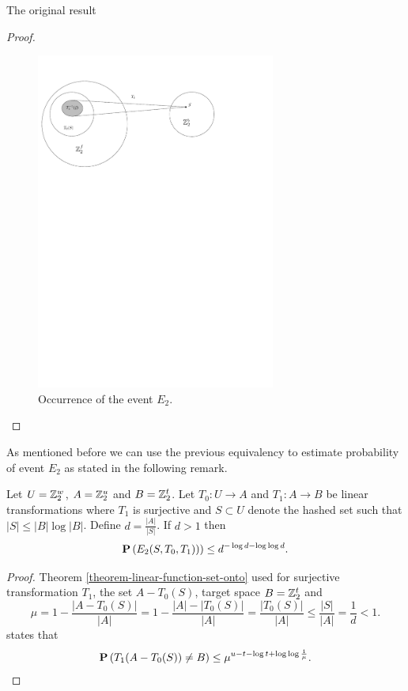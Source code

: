 \begin{section}{The original result}
\begin{proof}
\begin{figure}
  \centering
    \includegraphics[width=0.7\textwidth]{images/e2}

  \caption{Occurrence of the event $E_2$.}
\end{figure}

\end{proof}

As mentioned before we can use the previous equivalency to estimate probability of event $E_2$ as stated in the following remark. 
\begin{remark}
\label{remark-e2-probability}
Let $U = \mathbb{Z}_{2}^{w}$, $A = \mathbb{Z}_{2}^{u}$ and $B = \mathbb{Z}_{2}^{t}$. Let $T_0: U \rightarrow A$ and $T_1: A \rightarrow B$ be linear transformations where $T_1$ is surjective and $S \subset U$ denote the hashed set such that $|S| \leq |B| \log |B|$. Define $d = \frac{|A|}{|S|}$. If $d > 1$ then 
\[
	\mathbf{P}\left(E_2(S, T_0, T_1))\right) \leq d^{-\log d - \log \log d} \text{.}
\]
\end{remark}
\begin{proof}
Theorem \ref{theorem-linear-function-set-onto} used for surjective transformation $T_1$, the set $A - T_0(S)$, target space $B = \mathbb{Z}_{2}^{t}$ and \[
	\mu = 1 - \frac{|A - T_0(S)|}{|A|} = 1 - \frac{|A| - |T_0(S)|}{|A|} = \frac{|T_0(S)|}{|A|} \leq \frac{|S|}{|A|} = \frac{1}{d} < 1 \text{.}
\] states that
\[
	\mathbf{P}\left(T_1(A - T_0(S)) \neq B\right) \leq \mu ^ {u - t - \log t + \log \log \frac{1}{\mu}} \text{.}
\]


\end{proof}
\end{section}
